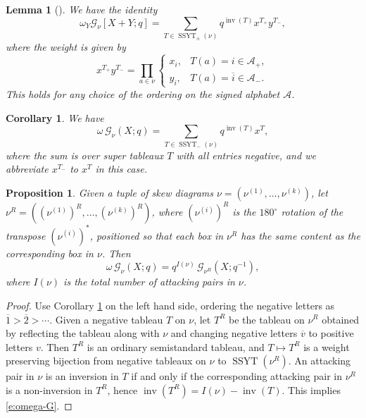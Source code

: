 \documentclass[12pt]{amsart}
\newtheorem{lemma}[thm]{Lemma}
\newtheorem{prop}[thm]{Proposition}
\newtheorem{cor}[thm]{Corollary}
\theoremstyle{definition}
\theoremstyle{remark}
\newcommand{\Acal}{{\mathcal A}}
\newcommand{\Gcal}{{\mathcal G}}
\DeclareMathOperator{\inv}{inv}
\DeclareMathOperator{\SSYT}{SSYT}
\begin{document}
\begin{lemma}[{\cite[(81--82) and Proposition 4.2]{HaHaLo05}}]
\label{lem:super-G}
We have the identity
\begin{equation}\label{e:super-G}
\omega _{Y} \Gcal _{\nu }[X+Y;q] = \sum _{T\in \SSYT _{\pm }(\nu )}
q^{\inv (T)} x^{T_{+}} y^{T_{-}},
\end{equation}
where the weight is given by
\begin{equation}\label{e:super-weight}
x^{T_{+}} y^{T_{-}} = \prod _{a\in \nu }\begin{cases}
x_{i},&	    T(a) = i\in  \Acal _{+},\\
y_{i},&	    T(a) = \overline{i} \in \Acal _{-}.
\end{cases}
\end{equation}
This holds for any choice of the ordering on the signed alphabet
$\Acal $.
\end{lemma}

\begin{cor}\label{cor:omega-super} We have
\begin{equation}\label{e:omega-super}
\omega\, \Gcal _{\nu }(X;q) = \sum _{T\in \SSYT_{-}(\nu)} q^{\inv
(T)}x^{T},
\end{equation}
where the sum is over super tableaux $T$ with all entries negative,
and we abbreviate $x^{T_{-}}$ to $x^{T}$ in this case.
\end{cor}


\begin{prop}\label{prop:omega-G} Given a tuple of skew
diagrams $\nu = (\nu ^{(1)},\ldots,\nu ^{(k)})$, let $\nu ^{R}= ((\nu
^{(1)})^{R},\ldots,(\nu ^{(k)})^{R})$, where $(\nu ^{(i)})^{R}$ is the
$180^{\circ }$ rotation of the transpose $(\nu ^{(i)})^{*}$,
positioned so that each box in $\nu ^{R}$ has the same content as the
corresponding box in $\nu $.  Then
\begin{equation}\label{e:omega-G}
\omega \, \Gcal _{\nu }(X;q) = q^{I(\nu )}\, \Gcal _{\nu
^{R}}(X;q^{-1}),
\end{equation}
where $I(\nu )$ is the total number of attacking pairs in $\nu $.
\end{prop}


\begin{proof}
Use Corollary \ref{cor:omega-super} on the left hand side, ordering
the negative letters as $\overline{1}>\overline{2}>\cdots $.  Given a
negative tableau $T$ on $\nu $, let $T^{R}$ be the tableau on $\nu
^{R}$ obtained by reflecting the tableau along with $\nu $ and
changing negative letters $\overline{v}$ to positive letters $v$.
Then $T^{R}$ is an ordinary semistandard tableau, and $T\mapsto T^{R}$
is a weight preserving bijection from negative tableaux on $\nu $ to
$\SSYT (\nu ^{R})$.  An attacking pair in $\nu $ is an inversion in
$T$ if and only if the corresponding attacking pair in $\nu ^{R}$ is a
non-inversion in $T^{R}$, hence $\inv (T^{R}) = I(\nu ) - \inv (T)$.
This implies \eqref{e:omega-G}.
\end{proof}
\end{document}
